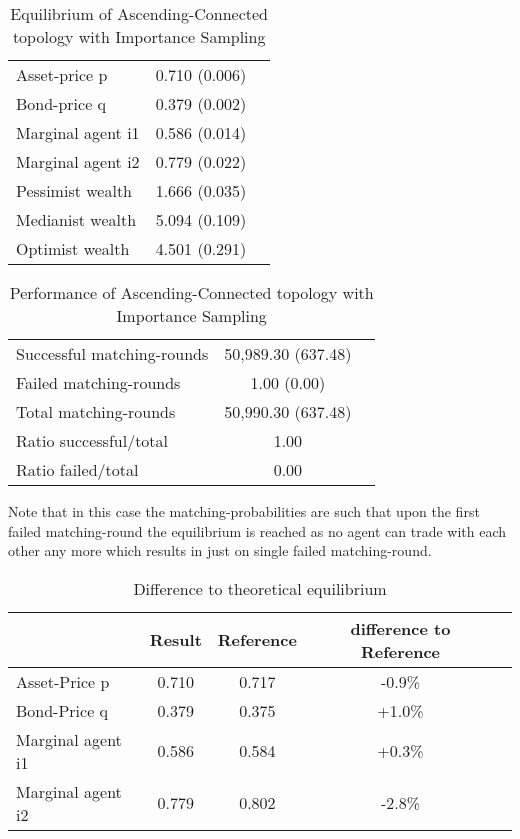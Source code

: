 \documentclass[Bachelorarbeit.tex]{subfiles}
\begin{document}
\begin{table}[H]
	\caption{Equilibrium of Ascending-Connected topology with Importance Sampling}
	\centering
	\begin{tabular} { l c r }
		\hline
		Asset-price p & 0.710 (0.006) \\
		Bond-price q & 0.379 (0.002) \\
		Marginal agent i1 & 0.586 (0.014) \\
		Marginal agent i2 & 0.779 (0.022) \\
		\hline
		Pessimist wealth & 1.666 (0.035) \\
		Medianist wealth & 5.094 (0.109) \\
		Optimist wealth & 4.501 (0.291) \\
		\hline
	\end{tabular}
\end{table} 

\begin{table}[H]
	\caption{Performance of Ascending-Connected topology with Importance Sampling}
	\centering
	\begin{tabular} { l c r }
		\hline
		Successful matching-rounds & 50,989.30 (637.48) \\
		Failed matching-rounds & 1.00 (0.00) \\
		Total matching-rounds & 50,990.30 (637.48) \\
		\hline
		Ratio successful/total & 1.00 \\
		Ratio failed/total & 0.00 \\
		\hline
	\end{tabular}
\end{table}

Note that in this case the matching-probabilities are such that upon the first failed matching-round the equilibrium is reached as no agent can trade with each other any more which results in just on single failed matching-round.

\begin{table}[H]
	\caption{Difference to theoretical equilibrium}
	\centering
	\begin{tabular} { l c c c r }
		& Result & Reference & difference to Reference \\
		\hline
		Asset-Price p & 0.710 & 0.717 & -0.9\% \\
		Bond-Price q & 0.379 & 0.375 & +1.0\% \\
		Marginal agent i1 & 0.586 & 0.584 & +0.3\% \\
		Marginal agent i2 & 0.779 & 0.802 & -2.8\% \\
		\hline
	\end{tabular}
\end{table}
\end{document}
